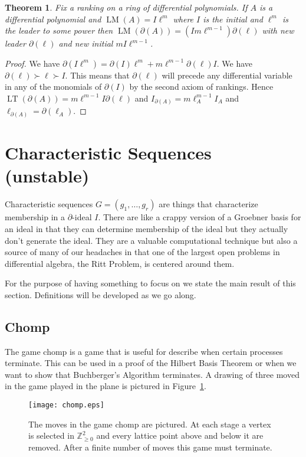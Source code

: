 \documentclass[12pt]{book}
\numberwithin{equation}{section}
\newtheorem{theorem}{Theorem}[subsection]
\theoremstyle{definition}
\theoremstyle{remark}
\newcommand{\ZZ}{\mathbb{Z}}
\newcommand{\LM}{\operatorname{LM}}
\newcommand{\LT}{\operatorname{LT}}
\begin{document}
\begin{theorem}
	Fix a ranking on a ring of differential polynomials.
	If $A$ is a differential polynomial and $\LM(A) = I \ell^m$ where $I$ is the initial and $\ell^m$ is the leader to some power then $\LM(\partial(A)) = (I m \ell^{m-1}) \partial(\ell)$ with new leader $\partial(\ell)$ and new initial $mI\ell^{m-1}$.
\end{theorem}
\begin{proof}
	We have $\partial(I \ell^m) = \partial(I)\ell^m + m\ell^{m-1}\partial(\ell)I$. 
	We have $\partial(\ell) \succ \ell \succ I$. 
	This means that $\partial(\ell)$ will precede any differential variable in any of the monomials of $\partial(I)$ by the second axiom of rankings.
	Hence $\LT(\partial(A) ) = m\ell^{m-1}I \partial(\ell)$ and $I_{\partial(A)} = m \ell_A^{m-1} I_A$ and $\ell_{\partial(A)} = \partial(\ell_A)$.
\end{proof}




\section{Characteristic Sequences (unstable)}

Characteristic sequences $G=(g_1,\ldots,g_r)$ are things that characterize membership in a $\partial$-ideal $I$.
There are like a crappy version of a Groebner basis for an ideal in that they can determine membership of the ideal but they actually don't generate the ideal. 
They are a valuable computational technique but also a source of many of our headaches in that one of the largest open problems in differential algebra, the Ritt Problem, is centered around them.

For the purpose of having something to focus on we state the main result of this section. 
Definitions will be developed as we go along. 

\subsection{Chomp}\label{S:chomp}

The game chomp is a game that is useful for describe when certain processes terminate. 
This can be used in a proof of the Hilbert Basis Theorem or when we want to show that Buchberger's Algorithm terminates. 
A drawing of three moved in the game played in the plane is pictured in Figure~\ref{F:chomp}.
\begin{figure}[h]
	\begin{center}
	\texttt{[image: chomp.eps]}
	\end{center}
\caption{The moves in the game chomp are pictured.
At each stage a vertex is selected in $\ZZ_{\geq 0}^2$ and every lattice point above and below it are removed. 
After a finite number of moves this game must terminate. }\label{F:chomp}
\end{figure}
\end{document}
